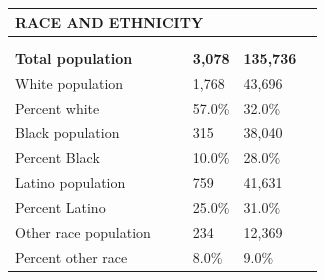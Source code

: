 \documentclass[9pt]{report}
\begin{document}
\vspace{12pt}
\setlength{\tabcolsep}{.01in} %
\begin{tabular}{p{.10in}p{.10in}p{.10in}p{3.7in}>{\hfill}p{.85in}>{\hfill}p{.85in}>{\hfill}p{.85in}>{\hfill}p{.85in}p{0.1in}}
\multicolumn{9}{l}{\parbox{7.1in}{\raggedright{\large{\strut\textbf{RACE AND ETHNICITY}\strut}}}} \\ 
\hline
\multicolumn{4}{l}{\parbox{3.5in}{\raggedright{\textbf{}}}} & \multicolumn{1}{r}{\parbox{.85in}{\strut\raggedleft{\textbf{}\strut}}} & \multicolumn{1}{r}{\parbox{.85in}{\strut\raggedleft{\textbf{}\strut}}} & \multicolumn{1}{r}{\parbox{.85in}{\strut{}}} & \multicolumn{1}{r}{\parbox{.85in}{\strut{}}} & \\ 
\multicolumn{9}{l}{} \\ 
\multicolumn{4}{l}{\parbox{3.5in}{\strut\raggedright{\textbf{Total population}\strut}}} & \textbf{} & \textbf{} & \textbf{3,078} & \textbf{135,736} & \textbf{} \\ 
\multicolumn{4}{l}{\parbox{3.6in}{\strut\raggedright{{White population}}\strut}} &  &  & 1,768 & 43,696 & \multicolumn{1}{l}{}  \\ 
\multicolumn{4}{l}{\parbox{3.6in}{\strut\raggedright{{Percent white}}\strut}} &  &  & 57.0\% & 32.0\% & \multicolumn{1}{l}{}  \\ 
\multicolumn{4}{l}{\parbox{3.6in}{\strut\raggedright{{Black population}}\strut}} &  &  & 315 & 38,040 & \multicolumn{1}{l}{}  \\ 
\multicolumn{4}{l}{\parbox{3.6in}{\strut\raggedright{{Percent Black}}\strut}} &  &  & 10.0\% & 28.0\% & \multicolumn{1}{l}{}  \\ 
\multicolumn{4}{l}{\parbox{3.6in}{\strut\raggedright{{Latino population}}\strut}} &  &  & 759 & 41,631 & \multicolumn{1}{l}{}  \\ 
\multicolumn{4}{l}{\parbox{3.6in}{\strut\raggedright{{Percent Latino}}\strut}} &  &  & 25.0\% & 31.0\% & \multicolumn{1}{l}{}  \\ 
\multicolumn{4}{l}{\parbox{3.6in}{\strut\raggedright{{Other race population}}\strut}} &  &  & 234 & 12,369 & \multicolumn{1}{l}{}  \\ 
\multicolumn{4}{l}{\parbox{3.6in}{\strut\raggedright{{Percent other race}}\strut}} &  &  & 8.0\% & 9.0\% & \multicolumn{1}{l}{}  \\ 

\end{tabular}
\setlength{\tabcolsep}{6pt} %
\end{document}
